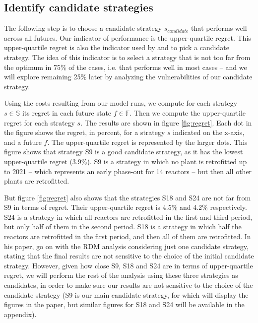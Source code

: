 \subsection{Identify candidate strategies}

The following step is to choose a candidate strategy $s_{candidate}$ that performs well across all futures. Our indicator of performance is the upper-quartile regret. This upper-quartile regret is also the indicator used by \citet{Lempert2006} and \citet{Nahmmacher2016} to pick a candidate strategy. The idea of this indicator is to select a strategy that is not too far from the optimum in 75\% of the cases, i.e. that performs well in most cases -- and we will explore remaining 25\% later by analyzing the vulnerabilities of our candidate strategy. 

Using the costs resulting from our model runs, we compute for each strategy $s \in \mathbb{S}$ its regret in each future state $f \in \mathbb{F}$. Then we compute the upper-quartile regret for each strategy $s$. The results are shown in figure \ref{fig:regret}. Each dot in the figure shows the regret, in percent, for a strategy $s$ indicated on the x-axis, and a future $f$. The upper-quartile regret is represented by the larger dots. This figure shows that strategy S9 is a good candidate strategy, as it has the lowest upper-quartile regret (3.9\%). S9 is a strategy in which no plant is retrofitted up to 2021 -- which represents an early phase-out for 14 reactors -- but then all other plants are retrofitted.

But figure \ref{fig:regret} also shows that the strategies S18 and S24 are not far from S9 in terms of regret. Their upper-quartile regret is 4.5\% and 4.2\% respectively. 
S24 is a strategy in which all reactors are retrofitted in the first and third period, but only half of them in the second period. S18 is a strategy in which half the reactors are retrofitted in the first period, and then all of them are retrofitted.
In his paper, \citet{Lempert2006} go on with the RDM analysis considering just one candidate strategy, stating that the final results are not sensitive to the choice of the initial candidate strategy. However, given how close S9, S18 and S24 are in terms of upper-quartile regret, we will perform the rest of the analysis using these three strategies as candidates, in order to make sure our results are not sensitive to the choice of the candidate strategy (S9 is our main candidate strategy, for which will display the figures in the paper, but similar figures for S18 and S24 will be available in the appendix).

